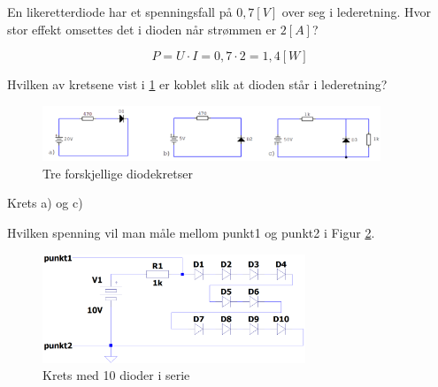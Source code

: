 \begin{question}[name=Oppgave, topic=dioder]
En likeretterdiode har et spenningsfall på $0,7 [V]$ over seg i lederetning. Hvor stor effekt omsettes det i dioden når strømmen er $2 [A]$?
\end{question}

\vspace{0.5cm} %


\begin{solution}[name=Løsningsforslag oppgave]
\[P=U\cdot I = 0,7\cdot2=1,4 [W]\]
	
\end{solution}

\vspace{0.5cm} %

\begin{question}[name=Oppgave, topic=dioder]
	Hvilken av kretsene vist i \ref{fig:3kretser} er koblet slik at dioden står i lederetning?
	
	\begin{figure}[H]
		\centering
		\includegraphics[width=0.9\textwidth]{diode/figurer/3Kretser.png}
		\caption{Tre forskjellige diodekretser}
		\label{fig:3kretser}
	\end{figure}
	
\end{question}

\vspace{0.5cm} %

\begin{solution}[name=Løsningsforslag oppgave]
	Krets a) og c)
\end{solution}
\vspace{0.5cm} %

\begin{question}[name=Oppgave, topic=dioder]
Hvilken spenning vil man måle mellom punkt1 og punkt2 i Figur \ref{fig:10Dserie}.

	\begin{figure}[H]
		\centering
		\includegraphics[width=0.7\textwidth]{diode/figurer/10SerieD.png}
		\caption{Krets med 10 dioder i serie}
		\label{fig:10Dserie}
	\end{figure}

\end{question}


